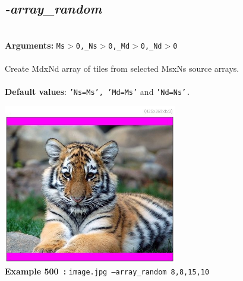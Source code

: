 \documentclass[a4paper,11pt,twoside]{book}
\begin{document}
\subsection{\emph{-array\_random} }\vspace*{-0.5em}
~\\\textbf{Arguments: } 
{\small \texttt{Ms$>$0,\_Ns$>$0,\_Md$>$0,\_Nd$>$0}}\\~\\
Create MdxNd array of tiles from selected MsxNs source arrays.
~\\~\\\textbf{Default values}: {\small \texttt{'Ns=Ms', 'Md=Ms'} and \texttt{'Nd=Ns'.}}
\begin{center}\includegraphics[keepaspectratio=true,height=7cm,width=\textwidth]{img/gmic_def500.jpg}\\
{\footnotesize \textbf{Example 500~:} \texttt{image.jpg --array\_random 8,8,15,10}}
\end{center}
\end{document}
